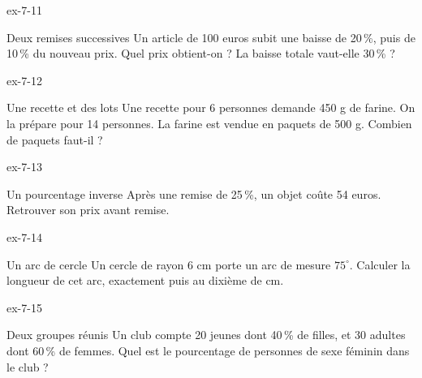 \begin{blocLivre}{ex-7-11}\begin{exercice}[3]{Deux remises successives}
Un article de 100 euros subit une baisse de 20\,\%, puis de 10\,\% du nouveau prix. Quel prix obtient-on ? La baisse totale vaut-elle 30\,\% ?
\end{exercice}\end{blocLivre}
\begin{blocLivre}{ex-7-12}\begin{exercice}[3]{Une recette et des lots}
Une recette pour 6 personnes demande 450 g de farine. On la prépare pour 14 personnes. La farine est vendue en paquets de 500 g. Combien de paquets faut-il ?
\end{exercice}\end{blocLivre}
\begin{blocLivre}{ex-7-13}\begin{exercice}[3]{Un pourcentage inverse}
Après une remise de 25\,\%, un objet coûte 54 euros. Retrouver son prix avant remise.
\end{exercice}\end{blocLivre}
\begin{blocLivre}{ex-7-14}\begin{exercice}[3]{Un arc de cercle}
Un cercle de rayon 6 cm porte un arc de mesure $75^\circ$. Calculer la longueur de cet arc, exactement puis au dixième de cm.
\label{fig-ex-7-14}
\end{exercice}\end{blocLivre}
\begin{blocLivre}{ex-7-15}\begin{exercice}[3]{Deux groupes réunis}
Un club compte 20 jeunes dont 40\,\% de filles, et 30 adultes dont 60\,\% de femmes. Quel est le pourcentage de personnes de sexe féminin dans le club ?
\end{exercice}\end{blocLivre}

\clearpage
